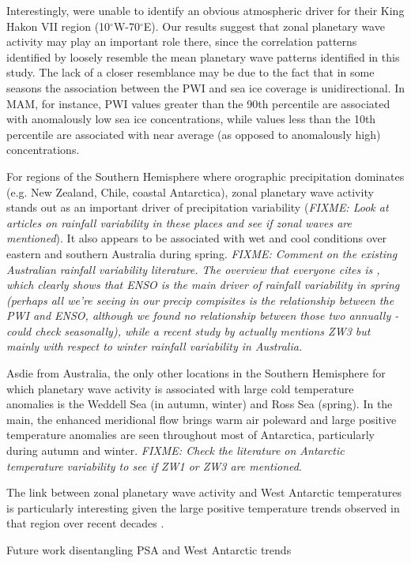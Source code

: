 Interestingly, \citet{Raphael2014} were unable to identify an obvious atmospheric driver for their King Hakon VII region (10$^{\circ}$W-70$^{\circ}$E). Our results suggest that zonal planetary wave activity may play an important role there, since the correlation patterns identified by \citet{Raphael2014} loosely resemble the mean planetary wave patterns identified in this study. The lack of a closer resemblance may be due to the fact that in some seasons the association between the PWI and sea ice coverage is unidirectional. In MAM, for instance, PWI values greater than the 90th percentile are associated with anomalously low sea ice concentrations, while values less than the 10th percentile are associated with near average (as opposed to anomalously high) concentrations.

For regions of the Southern Hemisphere where orographic precipitation dominates (e.g. New Zealand, Chile, coastal Antarctica), zonal planetary wave activity stands out as an important driver of precipitation variability (\textit{FIXME: Look at articles on rainfall variability in these places and see if zonal waves are mentioned}). It also appears to be associated with wet and cool conditions over eastern and southern Australia during spring. \textit{FIXME: Comment on the existing Australian rainfall variability literature. The overview that everyone cites is \citet{Risbey2009}, which clearly shows that ENSO is the main driver of rainfall variability in spring (perhaps all we're seeing in our precip compisites is the relationship between the PWI and ENSO, although we found no relationship between those two annually - could check seasonally), while a recent study by \citet{Frederiksen2014} actually mentions ZW3 but mainly with respect to winter rainfall variability in Australia.}

Asdie from Australia, the only other locations in the Southern Hemisphere for which planetary wave activity is associated with large cold temperature anomalies is the Weddell Sea (in autumn, winter) and Ross Sea (spring). In the main, the enhanced meridional flow brings warm air poleward and large positive temperature anomalies are seen throughout most of Antarctica, particularly during autumn and winter. \textit{FIXME: Check the literature on Antarctic temperature variability to see if ZW1 or ZW3 are mentioned}.

The link between zonal planetary wave activity and West Antarctic temperatures is particularly interesting given the large positive temperature trends observed in that region over recent decades \citep[e.g.][]{Bromwich2013}.   

Future work disentangling PSA and West Antarctic trends
